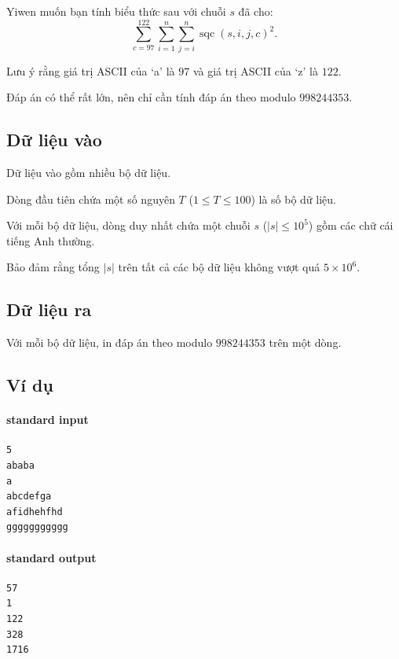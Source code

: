 \documentclass[11pt]{article}
\begin{document}
Yiwen muốn bạn tính biểu thức sau với chuỗi \(s\) đã cho:
\[
  \sum_{c=97}^{122}\sum_{i=1}^{n}\sum_{j=i}^{n}
  \operatorname{sqc}(s,i,j,c)^2.
\]

Lưu ý rằng giá trị ASCII của `a' là \(97\) và giá trị ASCII của `z' là \(122\).

Đáp án có thể rất lớn, nên chỉ cần tính đáp án theo modulo \(998244353\).

\subsection*{Dữ liệu vào}

Dữ liệu vào gồm nhiều bộ dữ liệu.

Dòng đầu tiên chứa một số nguyên \(T\) (\(1\le T\le 100\)) là số bộ dữ liệu.

Với mỗi bộ dữ liệu, dòng duy nhất chứa một chuỗi \(s\) (\(|s|\le 10^5\)) gồm
các chữ cái tiếng Anh thường.

Bảo đảm rằng tổng \(|s|\) trên tất cả các bộ dữ liệu không vượt quá
\(5\times 10^6\).

\subsection*{Dữ liệu ra}

Với mỗi bộ dữ liệu, in đáp án theo modulo \(998244353\) trên một dòng.

\subsection*{Ví dụ}

\paragraph{standard input}
\begin{verbatim}
5
ababa
a
abcdefga
afidhehfhd
ggggggggggg
\end{verbatim}

\paragraph{standard output}
\begin{verbatim}
57
1
122
328
1716
\end{verbatim}
\end{document}
